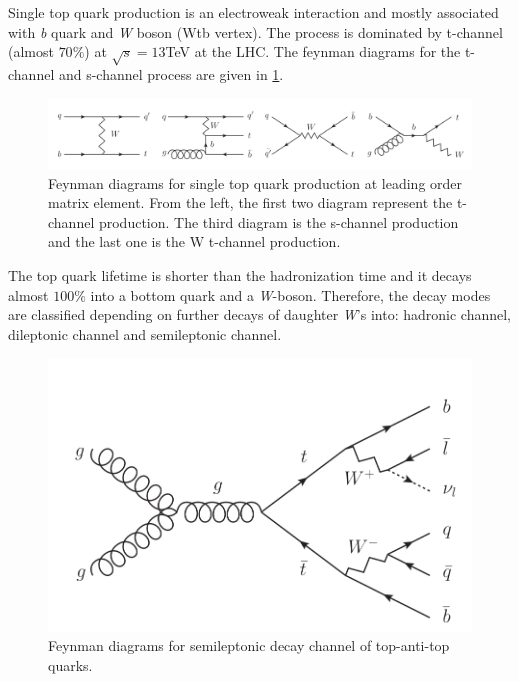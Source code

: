 Single top quark production is an electroweak interaction and mostly associated with \textit{b} quark and \textit{W}\textit{} boson (Wtb vertex). The process is dominated by t-channel (almost $70\%$) at $\sqrt{s}=13$TeV at the LHC. The feynman diagrams for the t-channel and s-channel process are given in \ref{fig:singletopproduction}.

\begin{figure}[H]
\centering
\includegraphics[scale=0.3]{Figures/single_top.png}
\decoRule
\caption{Feynman diagrams for single top quark production at leading order matrix element. From the left, the first two diagram represent the t-channel production. The third diagram is the s-channel production and the last one is the W t-channel production\cite{borathesis1}.}
\label{fig:singletopproduction}
\end{figure}

The top quark lifetime is shorter than the hadronization time and it decays almost $100\%$ into a bottom quark and a \textit{W}-boson. Therefore, the decay modes are classified depending on further decays of daughter \textit{W}'s into: hadronic channel, dileptonic channel and semileptonic channel.

\begin{figure}[H]
\centering
\includegraphics[scale=0.3]{Figures/top_decay.png}
\decoRule
\caption{Feynman diagrams for semileptonic decay channel of top-anti-top quarks\cite{borathesis1}.}
\label{fig:topdecay}
\end{figure}

